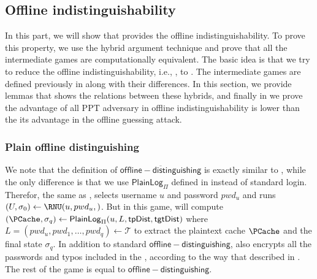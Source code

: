 \subsection{Offline indistinguishability}
In this part, we will show that  provides the offline indistinguishability. To prove this property, we use the hybrid argument technique and prove that all the intermediate games are computationally equivalent. The basic idea is that we try to reduce the offline indistinguishability, i.e., , to . The intermediate games are defined previously in  along with their differences. In this section, we provide lemmas that shows the relations between these hybrids, and finally in  we prove the advantage of all PPT adversary in offline indistinguishability is lower than the its advantage in the offline guessing attack.  


\subsubsection{Plain offline distinguishing}
We note that the definition of $ \overline{\mathsf{offline-distinguishing}} $ is exactly similar to , while the only difference is that we use $ \mathsf{PlainLog}_{\Pi}  $ defined in  instead of standard login. Therefor, the same as , \C selects username $ u $ and  password $ pwd_u $ and runs $ (U, \sigma_0)\gets \RNU(u, pwd_u, ) $. But in this game, \C will compute $(\PCache, \sigma_q) \gets  \mathsf{PlainLog}_{\Pi}(u, L, \mathsf{tpDist}, \mathsf{tgtDist}) $ where $ L = (pwd_u, pwd_1, \dots, pwd_q) \gets \mathcal{T} $ to extract the plaintext cache $ \PCache $ and the final state $ \sigma_q $. In addition to standard $ \mathsf{offline-distinguishing} $, \C also encrypts all the passwords and typos included in the \PCache, according to the way that described in . The rest of the game is equal to $ \mathsf{offline-distinguishing} $. 

 

